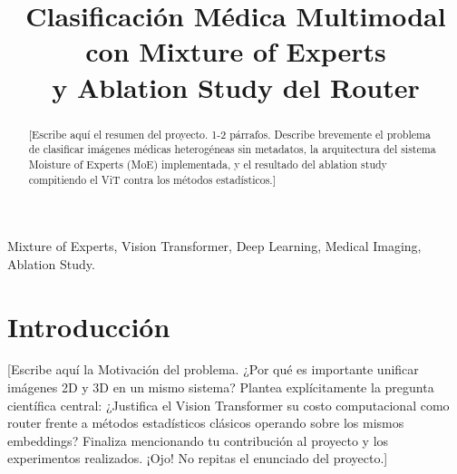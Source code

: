 \documentclass[conference, 11pt]{IEEEtran}
\begin{document}
\title{Clasificación Médica Multimodal con Mixture of Experts \\ y Ablation Study del Router}

\author{
\and
{}
\and
{}
}

\maketitle

\begin{abstract}
[Escribe aquí el resumen del proyecto. 1-2 párrafos. Describe brevemente el problema de clasificar imágenes médicas heterogéneas sin metadatos, la arquitectura del sistema Moisture of Experts (MoE) implementada, y el resultado del ablation study compitiendo el ViT contra los métodos estadísticos.]
\end{abstract}

\begin{IEEEkeywords}
Mixture of Experts, Vision Transformer, Deep Learning, Medical Imaging, Ablation Study.
\end{IEEEkeywords}

\section{Introducción}
[Escribe aquí la Motivación del problema. ¿Por qué es importante unificar imágenes 2D y 3D en un mismo sistema? 
Plantea explícitamente la pregunta científica central: ¿Justifica el Vision Transformer su costo computacional como router frente a métodos estadísticos clásicos operando sobre los mismos embeddings?
Finaliza mencionando tu contribución al proyecto y los experimentos realizados. ¡Ojo! No repitas el enunciado del proyecto.]
\end{document}
